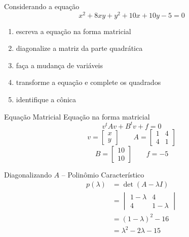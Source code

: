\begin{question}
  Considerando a equação
  \[
    x^2+8xy+y^2+10x+10y-5=0
  \]
  \vspace{-\baselineskip}
  \begin{enumerate}
    \item escreva a equação na forma matricial
    \item diagonalize a matriz da parte quadrática
    \item faça a mudança de variáveis
    \item transforme a equação e complete os quadrados
    \item identifique a cônica
  \end{enumerate}
\end{question}

\begin{resolution}{Equação Matricial}
  Equação na forma matricial
  \[
    v^tAv+B^tv+f=0
  \]
  \[
    v=\begin{bmatrix}x\\y\end{bmatrix}
    \qquad
    A=\begin{bmatrix}
      1&4\\
      4&1
    \end{bmatrix}
  \]
  \[
    B=\begin{bmatrix}10\\10\end{bmatrix}
    \qquad
    f=-5
  \]
\end{resolution}

\begin{resolution}{Diagonalizando $A$ -- Polinômio Característico}
  \begin{align*}
    p(\lambda)
    & = \det(A-\lambda I)
    \\
    & = \begin{vmatrix}
      1-\lambda&4\\
      4&1-\lambda
    \end{vmatrix}
    \\
    & = (1-\lambda)^2-16
    \\
    & = \lambda^2-2\lambda-15
  \end{align*}
\end{resolution}

